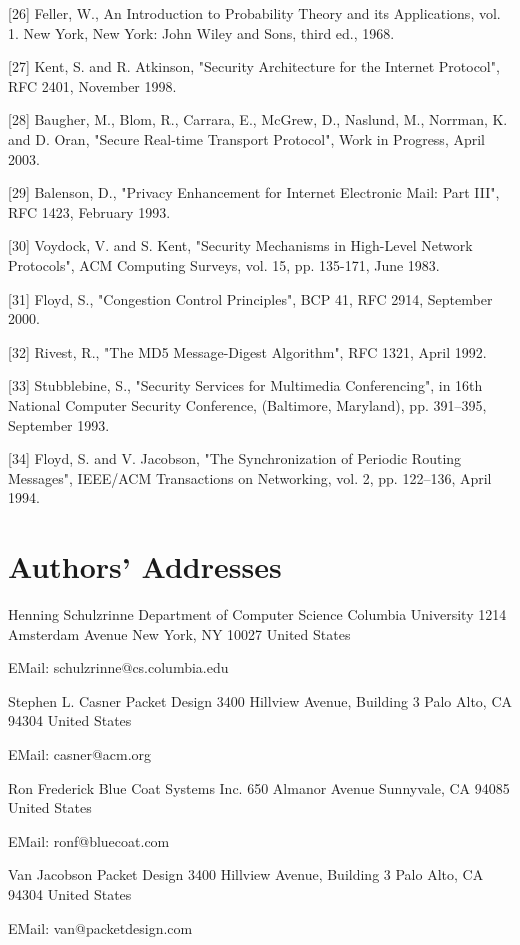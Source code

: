 \documentclass{article}
\begin{document}
[26] Feller, W., An Introduction to Probability Theory and its Applications, vol. 1.  New York, New York: John Wiley and Sons, third ed., 1968.

[27] Kent, S. and R. Atkinson, "Security Architecture for the Internet Protocol", RFC 2401, November 1998.

[28] Baugher, M., Blom, R., Carrara, E., McGrew, D., Naslund, M., Norrman, K. and D. Oran, "Secure Real-time Transport Protocol", Work in Progress, April 2003.

[29] Balenson, D., "Privacy Enhancement for Internet Electronic Mail: Part III", RFC 1423, February 1993.

[30] Voydock, V. and S. Kent, "Security Mechanisms in High-Level Network Protocols", ACM Computing Surveys, vol. 15, pp. 135-171, June 1983.

[31] Floyd, S., "Congestion Control Principles", BCP 41, RFC 2914, September 2000.

[32] Rivest, R., "The MD5 Message-Digest Algorithm", RFC 1321, April 1992.

[33] Stubblebine, S., "Security Services for Multimedia Conferencing", in 16th National Computer Security Conference, (Baltimore, Maryland), pp. 391--395, September 1993.

[34] Floyd, S. and V. Jacobson, "The Synchronization of Periodic Routing Messages", IEEE/ACM Transactions on Networking, vol. 2, pp. 122--136, April 1994.

\section*{Authors' Addresses}

Henning Schulzrinne Department of Computer Science Columbia University 1214 Amsterdam Avenue New York, NY 10027 United States

EMail: schulzrinne@cs.columbia.edu

Stephen L. Casner Packet Design 3400 Hillview Avenue, Building 3 Palo Alto, CA 94304 United States

EMail: casner@acm.org

Ron Frederick Blue Coat Systems Inc. 650 Almanor Avenue Sunnyvale, CA 94085 United States

EMail: ronf@bluecoat.com

Van Jacobson Packet Design 3400 Hillview Avenue, Building 3 Palo Alto, CA 94304 United States

EMail: van@packetdesign.com
\end{document}
